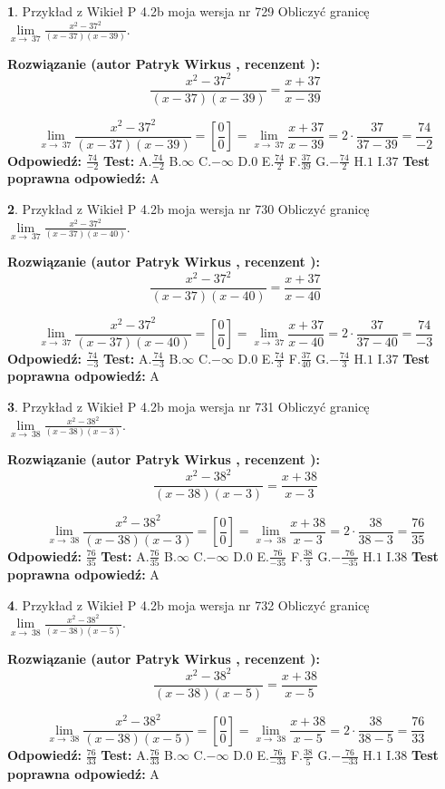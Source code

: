\documentclass[12pt, a4paper]{article}
\theoremstyle{definition} %
\newtheorem{zad}{}
\newcommand{\zadStart}[1]{\begin{zad}#1\newline}
\newcommand{\zadStop}{\end{zad}}
\newcommand{\rozwStart}[2]{\noindent \textbf{Rozwiązanie (autor #1 , recenzent #2): }\newline}
\newcommand{\rozwStop}{\newline}
\newcommand{\odpStart}{\noindent \textbf{Odpowiedź:}\newline}
\newcommand{\odpStop}{\newline}
\newcommand{\testStart}{\noindent \textbf{Test:}\newline}
\newcommand{\testStop}{\newline}
\newcommand{\kluczStart}{\noindent \textbf{Test poprawna odpowiedź:}\newline}
\newcommand{\kluczStop}{\newline}
\begin{document}
\zadStart{Przykład z Wikieł P 4.2b moja wersja nr 729}
Obliczyć granicę $\lim\limits_{x\to\ 37}\frac{x^{2}-37^{2}}{(x-37)(x-39)}$.
\zadStop
\rozwStart{Patryk Wirkus}{}
$$\frac{x^{2}-37^{2}}{(x-37)(x-39)}=\frac{x+37}{x-39}$$

$$\lim\limits_{x\to\ 37}\frac{x^{2}-37^{2}}{(x-37)(x-39)}=[\frac{0}{0}]=\lim\limits_{x\to\ 37}\frac{x+37}{x-39}=2 \cdot \frac{37}{37-39} = \frac{74}{-2}$$
\rozwStop
\odpStart
$\frac{74}{-2}$
\odpStop
\testStart
A.$\frac{74}{-2}$
B.$\infty$
C.$-\infty$
D.$0$
E.$\frac{74}{2}$
F.$\frac{37}{39}$
G.$-\frac{74}{2}$
H.$1$
I.$37$
\testStop
\kluczStart
A
\kluczStop



\zadStart{Przykład z Wikieł P 4.2b moja wersja nr 730}
Obliczyć granicę $\lim\limits_{x\to\ 37}\frac{x^{2}-37^{2}}{(x-37)(x-40)}$.
\zadStop
\rozwStart{Patryk Wirkus}{}
$$\frac{x^{2}-37^{2}}{(x-37)(x-40)}=\frac{x+37}{x-40}$$

$$\lim\limits_{x\to\ 37}\frac{x^{2}-37^{2}}{(x-37)(x-40)}=[\frac{0}{0}]=\lim\limits_{x\to\ 37}\frac{x+37}{x-40}=2 \cdot \frac{37}{37-40} = \frac{74}{-3}$$
\rozwStop
\odpStart
$\frac{74}{-3}$
\odpStop
\testStart
A.$\frac{74}{-3}$
B.$\infty$
C.$-\infty$
D.$0$
E.$\frac{74}{3}$
F.$\frac{37}{40}$
G.$-\frac{74}{3}$
H.$1$
I.$37$
\testStop
\kluczStart
A
\kluczStop



\zadStart{Przykład z Wikieł P 4.2b moja wersja nr 731}
Obliczyć granicę $\lim\limits_{x\to\ 38}\frac{x^{2}-38^{2}}{(x-38)(x-3)}$.
\zadStop
\rozwStart{Patryk Wirkus}{}
$$\frac{x^{2}-38^{2}}{(x-38)(x-3)}=\frac{x+38}{x-3}$$

$$\lim\limits_{x\to\ 38}\frac{x^{2}-38^{2}}{(x-38)(x-3)}=[\frac{0}{0}]=\lim\limits_{x\to\ 38}\frac{x+38}{x-3}=2 \cdot \frac{38}{38-3} = \frac{76}{35}$$
\rozwStop
\odpStart
$\frac{76}{35}$
\odpStop
\testStart
A.$\frac{76}{35}$
B.$\infty$
C.$-\infty$
D.$0$
E.$\frac{76}{-35}$
F.$\frac{38}{3}$
G.$-\frac{76}{-35}$
H.$1$
I.$38$
\testStop
\kluczStart
A
\kluczStop



\zadStart{Przykład z Wikieł P 4.2b moja wersja nr 732}
Obliczyć granicę $\lim\limits_{x\to\ 38}\frac{x^{2}-38^{2}}{(x-38)(x-5)}$.
\zadStop
\rozwStart{Patryk Wirkus}{}
$$\frac{x^{2}-38^{2}}{(x-38)(x-5)}=\frac{x+38}{x-5}$$

$$\lim\limits_{x\to\ 38}\frac{x^{2}-38^{2}}{(x-38)(x-5)}=[\frac{0}{0}]=\lim\limits_{x\to\ 38}\frac{x+38}{x-5}=2 \cdot \frac{38}{38-5} = \frac{76}{33}$$
\rozwStop
\odpStart
$\frac{76}{33}$
\odpStop
\testStart
A.$\frac{76}{33}$
B.$\infty$
C.$-\infty$
D.$0$
E.$\frac{76}{-33}$
F.$\frac{38}{5}$
G.$-\frac{76}{-33}$
H.$1$
I.$38$
\testStop
\kluczStart
A
\kluczStop
\end{document}
